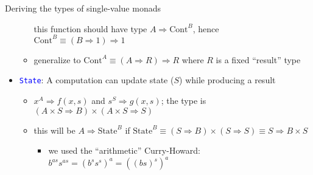 \documentclass[english]{beamer}
\begin{document}
\begin{frame}{Deriving the types of single-value monads}
\begin{itemize}
\begin{itemize}
this function should have type {\footnotesize{}$A\Rightarrow\text{Cont}^{B}$},
hence{\footnotesize{} $\text{Cont}^{B}\equiv\left(B\Rightarrow1\right)\Rightarrow1$}{\footnotesize \par}
\item generalize to {\footnotesize{}$\text{Cont}^{A}\equiv\left(A\Rightarrow R\right)\Rightarrow R$
}where $R$ is a fixed ``result'' type
\end{itemize}
\item \texttt{\textcolor{blue}{\footnotesize{}State}}: A computation can
update state ($S$) while producing a result
\begin{itemize}
\item $x^{A}\Rightarrow f(x,s)$ and $s^{S}\Rightarrow g(x,s)$; the type
is{\footnotesize{} $\left(A\times S\Rightarrow B\right)\times\left(A\times S\Rightarrow S\right)$}{\footnotesize \par}
\item this will be $A\Rightarrow\text{State}^{B}$ if {\footnotesize{}$\text{State}^{B}\equiv\left(S\Rightarrow B\right)\times\left(S\Rightarrow S\right)\equiv S\Rightarrow B\times S$ }{\footnotesize \par}
\begin{itemize}
\item we used the ``arithmetic'' Curry-Howard: $b^{as}s^{as}=(b^{s}s^{s})^{a}=\left(\left(bs\right)^{s}\right)^{a}$
\end{itemize}
\end{itemize}
\end{itemize}
\end{frame}
\end{document}
